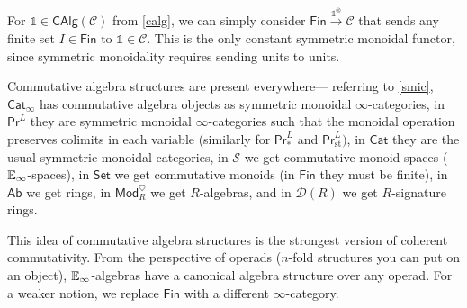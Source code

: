    \begin{example}
       For $\mathbb 1 \in  \mathsf{CAlg} (\mathcal{C} )$ from \cref{calg}, we can simply consider $\mathsf{Fin} \xrightarrow{\mathbb 1^{\otimes}} \mathcal{C} $ that sends any finite set $ I \in \mathsf{Fin} $ to $\mathbb 1 \in \mathcal{C} $. This is the only constant symmetric monoidal functor, since symmetric monoidality requires sending units to units.
   \end{example}
   \begin{example}
       Commutative algebra structures are present everywhere--- referring to \cref{smic}, $\mathsf{Cat} _{\infty}$ has commutative algebra objects as symmetric monoidal $\infty$-categories, in $\mathsf{Pr} ^L$ they are symmetric monoidal $\infty$-categories such that the monoidal operation preserves colimits in each variable (similarly for $\mathsf{Pr} _*^L$ and $\mathsf{Pr} _{\mathrm{st}}^L)$, in $\mathsf{Cat} $ they are the usual symmetric monoidal categories, in $\mathcal{S} $ we get commutative monoid spaces ($\mathbb{E}_{\infty}$-spaces), in $\mathsf{Set} $ we get commutative monoids (in $\mathsf{Fin} $ they must be finite), in $\mathsf{Ab} $ we get rings, in $\mathsf{Mod} _R^{\heartsuit}$ we get $R$-algebras, and in $\mathcal{D} (R)$ we get $R$-signature rings. 
   \end{example}
   This idea of commutative algebra structures is the strongest version of coherent commutativity. From the perspective of operads ($n$-fold structures you can put on an object), $\mathbb{E}_{\infty}$-algebras have a canonical algebra structure over any operad. For a weaker notion,  we replace $\mathsf{Fin} $ with a different $\infty$-category.

